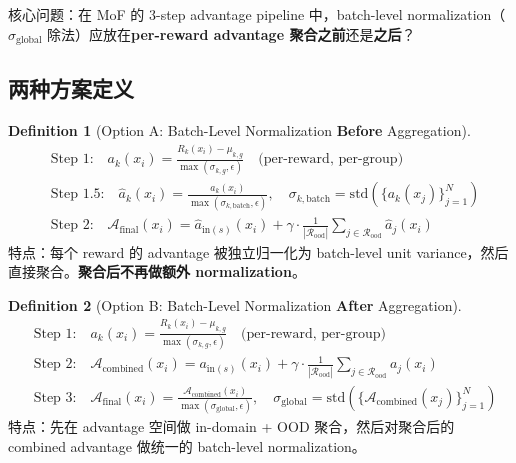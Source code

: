 \documentclass[11pt,a4paper]{article}
\theoremstyle{definition}
\newtheorem{definition}{Definition}
\begin{document}
核心问题：在 MoF 的 3-step advantage pipeline 中，batch-level normalization（$\sigma_{\mathrm{global}}$ 除法）应放在\textbf{per-reward advantage 聚合之前}还是\textbf{之后}？

\subsection{两种方案定义}

\begin{definition}[Option A: Batch-Level Normalization \textbf{Before} Aggregation]
\label{def:norm_before}
\begin{align}
&\text{Step 1:}\quad a_k(x_i) = \frac{R_k(x_i) - \mu_{k,g}}{\max(\sigma_{k,g}, \epsilon)} \quad\text{(per-reward, per-group)} \\
&\text{Step 1.5:}\quad \hat{a}_k(x_i) = \frac{a_k(x_i)}{\max(\sigma_{k,\mathrm{batch}}, \epsilon)}, \quad \sigma_{k,\mathrm{batch}} = \mathrm{std}(\{a_k(x_j)\}_{j=1}^N) \\
&\text{Step 2:}\quad \mathcal{A}_{\mathrm{final}}(x_i) = \hat{a}_{\mathrm{in}(s)}(x_i) + \gamma \cdot \frac{1}{|\mathcal{R}_{\mathrm{ood}}|}\sum_{j \in \mathcal{R}_{\mathrm{ood}}} \hat{a}_j(x_i)
\end{align}
特点：每个 reward 的 advantage 被独立归一化为 batch-level unit variance，然后直接聚合。\textbf{聚合后不再做额外 normalization}。
\end{definition}

\begin{definition}[Option B: Batch-Level Normalization \textbf{After} Aggregation]
\label{def:norm_after}
\begin{align}
&\text{Step 1:}\quad a_k(x_i) = \frac{R_k(x_i) - \mu_{k,g}}{\max(\sigma_{k,g}, \epsilon)} \quad\text{(per-reward, per-group)} \\
&\text{Step 2:}\quad \mathcal{A}_{\mathrm{combined}}(x_i) = a_{\mathrm{in}(s)}(x_i) + \gamma \cdot \frac{1}{|\mathcal{R}_{\mathrm{ood}}|}\sum_{j \in \mathcal{R}_{\mathrm{ood}}} a_j(x_i) \\
&\text{Step 3:}\quad \mathcal{A}_{\mathrm{final}}(x_i) = \frac{\mathcal{A}_{\mathrm{combined}}(x_i)}{\max(\sigma_{\mathrm{global}}, \epsilon)}, \quad \sigma_{\mathrm{global}} = \mathrm{std}(\{\mathcal{A}_{\mathrm{combined}}(x_j)\}_{j=1}^N)
\end{align}
特点：先在 advantage 空间做 in-domain + OOD 聚合，然后对聚合后的 combined advantage 做统一的 batch-level normalization。
\end{definition}
\end{document}
